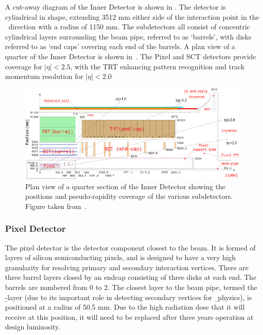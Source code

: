 A cut-away diagram of the Inner Detector is shown in . The detector
is cylindrical in shape, extending 3512 mm either side of the interaction point
in the \z\ direction with a radius of 1150 mm. The subdetectors all consist of
concentric cylindrical layers surrounding the beam pipe, referred to as
`barrels', with disks referred to as `end caps' covering each end of the
barrels. A plan view of a quarter of the Inner Detector is shown
in~. The Pixel and SCT detectors provide coverage for $|\eta|<2.5$,
with the TRT enhancing pattern recognition and track momentum resolution for
$|\eta|<2.0$

\begin{figure}[h]
\centering
\includegraphics[width=\textwidth]{FigID26-mod-011107_crop}
\caption[Plan view of a quarter section of the Inner Detector showing the
positions and pseudo-rapidity coverage of the various subdetectors. ]{Plan view of a quarter section of the Inner Detector showing the
positions and pseudo-rapidity coverage of the various subdetectors. Figure taken from~\cite{Aad:1125884}.}
\label{fig:id-plan}
\end{figure}

\subsubsection{Pixel Detector}

The pixel detector is the detector component closest to the beam. It is formed
of layers of silicon semiconducting pixels, and is designed to have a very
high granularity for resolving primary and secondary interaction vertices. There
are three barrel layers closed by an endcap consisting of three disks at each
end. The barrels are numbered from 0 to 2. The closest layer to the beam
pipe, termed the \b-layer (due to its important role in detecting secondary
vertices for \b\ physics), is
positioned at a radius of 50.5 mm. Due to the high radiation dose that it will receive at this position, it will need to be replaced after three years
operation at design luminosity.

